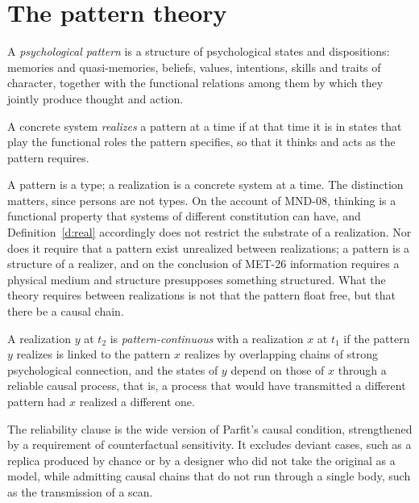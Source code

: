 \documentclass{situationist-preprint}
\begin{document}
\section{The pattern theory}\label{s:frame}

\begin{definition}[Pattern]\label{d:pattern}
A \emph{psychological pattern} is a structure of psychological states and dispositions: memories and quasi-memories, beliefs, values, intentions, skills and traits of character, together with the functional relations among them by which they jointly produce thought and action.
\end{definition}

\begin{definition}[Realization]\label{d:real}
A concrete system \emph{realizes} a pattern at a time if at that time it is in states that play the functional roles the pattern specifies, so that it thinks and acts as the pattern requires.
\end{definition}

A pattern is a type; a realization is a concrete system at a time. The distinction matters, since persons are not types. On the account of MND-08, thinking is a functional property that systems of different constitution can have, and Definition~\ref{d:real} accordingly does not restrict the substrate of a realization. Nor does it require that a pattern exist unrealized between realizations; a pattern is a structure of a realizer, and on the conclusion of MET-26 information requires a physical medium and structure presupposes something structured. What the theory requires between realizations is not that the pattern float free, but that there be a causal chain.

\begin{definition}\label{d:cont}
A realization $y$ at $t_2$ is \emph{pattern-continuous} with a realization $x$ at $t_1$ if the pattern $y$ realizes is linked to the pattern $x$ realizes by overlapping chains of strong psychological connection, and the states of $y$ depend on those of $x$ through a reliable causal process, that is, a process that would have transmitted a different pattern had $x$ realized a different one.
\end{definition}

The reliability clause is the wide version of Parfit's causal condition, strengthened by a requirement of counterfactual sensitivity. It excludes deviant cases, such as a replica produced by chance or by a designer who did not take the original as a model, while admitting causal chains that do not run through a single body, such as the transmission of a scan.
\end{document}
